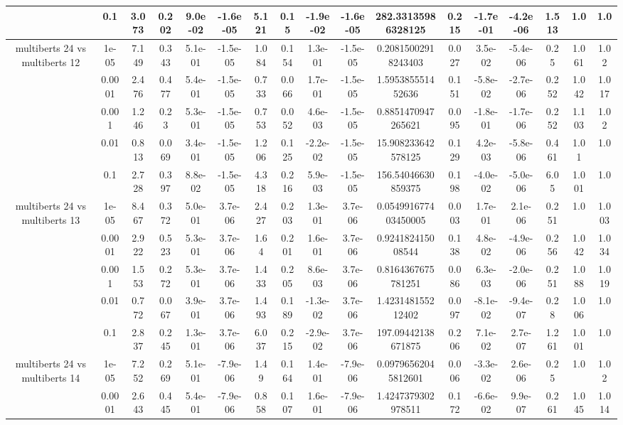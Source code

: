 \begin{tabular}{|c|c|c|c|c|c|c|c|c|c|c|c|c|c|c|c|c|}
 & 0.1 & 3.073 & 0.202 & 9.0e-02 & -1.6e-05 & 5.121 & 0.15 & -1.9e-02 & -1.6e-05 & 282.33135986328125 & 0.215 & -1.7e-01 & -4.2e-06 & 1.513 & 1.0 & 1.0 \\
\hline
\multirow{5}{*}{multiberts 24 vs multiberts 12} & 1e-05 & 7.149 & 0.343 & 5.1e-01 & -1.5e-05 & 1.084 & 0.154 & 1.3e-01 & -1.5e-05 & 0.20815002918243403 & 0.027 & 3.5e-02 & -5.4e-06 & 0.25 & 1.061 & 1.02 \\
 & 0.0001 & 2.476 & 0.477 & 5.4e-01 & -1.5e-05 & 0.733 & 0.066 & 1.7e-01 & -1.5e-05 & 1.595385551452636 & 0.151 & -5.8e-02 & -2.7e-06 & 0.252 & 1.042 & 1.017 \\
 & 0.001 & 1.246 & 0.23 & 5.3e-01 & -1.5e-05 & 0.753 & 0.052 & 4.6e-03 & -1.5e-05 & 0.8851470947265621 & 0.095 & -1.8e-01 & -1.7e-06 & 0.252 & 1.103 & 1.02 \\
 & 0.01 & 0.813 & 0.069 & 3.4e-01 & -1.5e-05 & 1.206 & 0.125 & -2.2e-02 & -1.5e-05 & 15.908233642578125 & 0.129 & 4.2e-03 & -5.8e-06 & 0.461 & 1.01 & 1.0 \\
 & 0.1 & 2.728 & 0.397 & 8.8e-02 & -1.5e-05 & 4.318 & 0.216 & 5.9e-03 & -1.5e-05 & 156.54046630859375 & 0.198 & -4.0e-02 & -5.0e-06 & 6.05 & 1.001 & 1.0 \\
\hline
\multirow{5}{*}{multiberts 24 vs multiberts 13} & 1e-05 & 8.467 & 0.372 & 5.0e-01 & 3.7e-06 & 2.427 & 0.203 & 1.3e-01 & 3.7e-06 & 0.054991677403450005 & 0.003 & 1.7e-01 & 2.1e-06 & 0.251 & 1.0 & 1.003 \\
 & 0.0001 & 2.922 & 0.523 & 5.3e-01 & 3.7e-06 & 1.64 & 0.201 & 1.6e-01 & 3.7e-06 & 0.924182415008544 & 0.138 & 4.8e-02 & -4.9e-06 & 0.256 & 1.042 & 1.034 \\
 & 0.001 & 1.553 & 0.272 & 5.3e-01 & 3.7e-06 & 1.433 & 0.205 & 8.6e-03 & 3.7e-06 & 0.8164367675781251 & 0.086 & 6.3e-03 & -2.0e-06 & 0.251 & 1.088 & 1.019 \\
 & 0.01 & 0.772 & 0.067 & 3.9e-01 & 3.7e-06 & 1.493 & 0.189 & -1.3e-02 & 3.7e-06 & 1.423148155212402 & 0.097 & -8.1e-02 & -9.4e-07 & 0.28 & 1.006 & 1.0 \\
 & 0.1 & 2.837 & 0.245 & 1.3e-01 & 3.7e-06 & 6.037 & 0.215 & -2.9e-02 & 3.7e-06 & 197.09442138671875 & 0.206 & 7.1e-02 & 2.7e-07 & 1.261 & 1.001 & 1.0 \\
\hline
\multirow{5}{*}{multiberts 24 vs multiberts 14} & 1e-05 & 7.252 & 0.269 & 5.1e-01 & -7.9e-06 & 1.49 & 0.164 & 1.4e-01 & -7.9e-06 & 0.09796562045812601 & 0.006 & -3.3e-02 & 2.6e-06 & 0.25 & 1.0 & 1.02 \\
 & 0.0001 & 2.643 & 0.445 & 5.4e-01 & -7.9e-06 & 0.858 & 0.107 & 1.6e-01 & -7.9e-06 & 1.4247379302978511 & 0.172 & -6.6e-02 & 9.9e-07 & 0.261 & 1.045 & 1.014 \\

\end{tabular}
